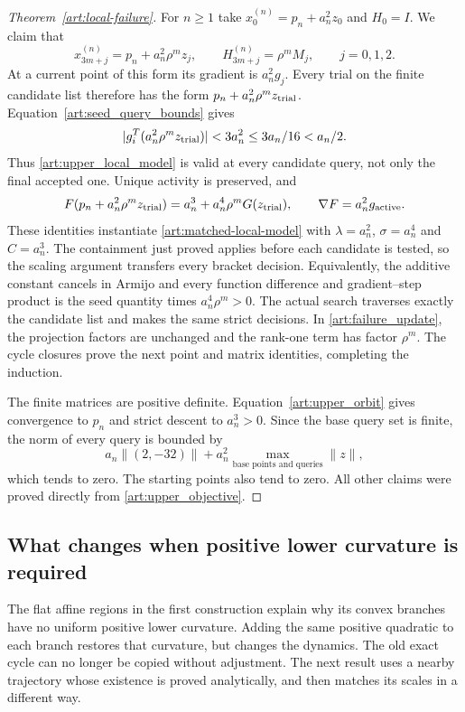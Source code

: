 \begin{proof}[Theorem~\ref{art:local-failure}]
For $n\ge1$ take $x_0^{(n)}=p_n+a_n^2z_0$ and $H_0=I$. We claim that
\begin{equation}\label{art:upper_orbit}
 x_{3m+j}^{(n)}=p_n+a_n^2\rho^mz_j,\qquad
 H_{3m+j}^{(n)}=\rho^mM_j,\qquad j=0,1,2.
\end{equation}
At a current point of this form its gradient is $a_n^2g_j$. Every trial
on the finite candidate list therefore has the form
$p_n+a_n^2\rho^mz_{\rm trial}$. Equation~\eqref{art:seed_query_bounds}
gives
\[
 |g_i^T(a_n^2\rho^mz_{\rm trial})|<3a_n^2
 \le3a_n/16<a_n/2.
\]
Thus \eqref{art:upper_local_model} is valid at every candidate query,
not only the final accepted one. Unique activity is preserved, and
\[
 F(p_n+a_n^2\rho^mz_{\rm trial})
   =a_n^3+a_n^4\rho^mG(z_{\rm trial}),\qquad
 \nabla F=a_n^2g_{\rm active}.
\]
These identities instantiate \eqref{art:matched-local-model} with
$\lambda=a_n^2$, $\sigma=a_n^4$ and $C=a_n^3$. The containment just
proved applies before each candidate is tested, so the scaling argument
transfers every bracket decision. Equivalently, the additive constant
cancels in Armijo and every function difference and gradient--step product
is the seed quantity times $a_n^4\rho^m>0$. The actual search traverses
exactly the candidate list and makes the same strict decisions.
In \eqref{art:failure_update}, the projection factors are unchanged and
the rank-one term has factor $\rho^m$. The cycle closures prove the next
point and matrix identities, completing the induction.

The finite matrices are positive definite. Equation~\eqref{art:upper_orbit}
gives convergence to $p_n$ and strict descent to $a_n^3>0$.
Since the base query set is finite, the norm of every query is bounded by
\[
 a_n\|(2,-32)\|+a_n^2\max_{\text{base points and queries}}\|z\|,
\]
which tends to zero. The starting points also tend to zero. All other
claims were proved directly from \eqref{art:upper_objective}.
\end{proof}


\subsection{What changes when positive lower curvature is required}
The flat affine regions in the first construction explain why its convex
branches have no uniform positive lower curvature. Adding the same positive
quadratic to each branch restores that curvature, but changes the dynamics.
The old exact cycle can no longer be copied without adjustment. The next
result uses a nearby trajectory whose existence is proved analytically,
and then matches its scales in a different way.



